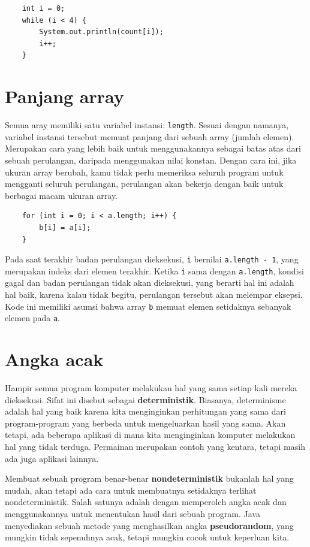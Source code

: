 \begin{lstlisting}
    int i = 0;
    while (i < 4) {
        System.out.println(count[i]);
        i++;
    }
\end{lstlisting}


\section{Panjang array}

Semua aray memiliki satu variabel instansi: {\tt length}.
Sesuai dengan namanya, variabel instansi tersebut memuat panjang dari sebuah array  (jumlah elemen). Merupakan cara yang lebih baik untuk menggunakannya sebagai batas atas dari sebuah perulangan, daripada menggunakan nilai konstan.  Dengan cara ini, jika ukuran array berubah, kamu tidak perlu memeriksa seluruh program untuk mengganti seluruh perulangan, perulangan akan bekerja dengan baik untuk berbagai macam ukuran array.

\begin{lstlisting}
    for (int i = 0; i < a.length; i++) {
        b[i] = a[i];
    }
\end{lstlisting}
%
Pada saat terakhir badan perulangan dieksekusi, {\tt i}
bernilai {\tt a.length - 1}, yang merupakan indeks dari elemen terakhir. Ketika
{\tt i} sama dengan {\tt a.length}, kondisi gagal dan badan perulangan tidak akan dieksekusi, yang berarti hal ini adalah hal baik, karena kalau tidak begitu, perulangan tersebut akan melempar eksepsi.  Kode ini memiliki asumsi bahwa array {\tt b} memuat elemen setidaknya sebanyak elemen pada {\tt a}.


\section{Angka acak}
\label{random}
\label{pseudorandom}

Hampir semua program komputer melakukan hal yang sama setiap kali mereka dieksekusi. Sifat ini disebut sebagai {\bf deterministik}.  Biasanya, determinisme adalah  hal yang baik karena kita menginginkan perhitungan yang sama dari program-program yang berbeda untuk mengeluarkan hasil yang sama. Akan tetapi, ada beberapa aplikasi di mana kita menginginkan komputer melakukan hal yang tidak terduga. Permainan merupakan contoh yang kentara, tetapi masih ada juga aplikasi lainnya.

Membuat sebuah program benar-benar {\bf nondeterministik} bukanlah hal yang mudah, akan tetapi ada cara untuk membuatnya setidaknya terlihat nondeterministik. Salah satunya adalah dengan memperoleh angka acak dan menggunakannya untuk menentukan hasil dari sebuah program. Java menyediakan sebuah metode yang menghasilkan angka 
{\bf pseudorandom}, yang mungkin tidak sepenuhnya acak, tetapi mungkin cocok untuk keperluan kita.

